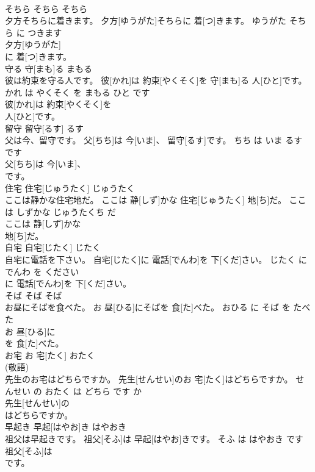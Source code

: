 \documentclass[8pt]{extreport}
\begin{document}
\begin{CJK}{UTF8}{min}
\\	そちら	そちら	そちら	
\\	夕方そちらに着きます。	夕方[ゆうがた]そちらに 着[つ]きます。	ゆうがた そちら に つきます	
\\	夕方[ゆうがた]
\\	に 着[つ]きます。		
\\	守る	守[まも]る	まもる	
\\	彼は約束を守る人です。	彼[かれ]は 約束[やくそく]を 守[まも]る 人[ひと]です。	かれ は やくそく を まもる ひと です	
\\	彼[かれ]は 約束[やくそく]を
\\	人[ひと]です。		
\\	留守	留守[るす]	るす	
\\	父は今、留守です。	父[ちち]は 今[いま]、 留守[るす]です。	ちち は いま るす です	
\\	父[ちち]は 今[いま]、
\\	です。		
\\	住宅	住宅[じゅうたく]	じゅうたく	
\\	ここは静かな住宅地だ。	ここは 静[しず]かな 住宅[じゅうたく] 地[ち]だ。	ここ は しずかな じゅうたくち だ	
\\	ここは 静[しず]かな
\\	地[ち]だ。		
\\	自宅	自宅[じたく]	じたく	
\\	自宅に電話を下さい。	自宅[じたく]に 電話[でんわ]を 下[くだ]さい。	じたく に でんわ を ください	
\\	に 電話[でんわ]を 下[くだ]さい。		
\\	そば	そば	そば	
\\	お昼にそばを食べた。	お 昼[ひる]にそばを 食[た]べた。	おひる に そば を たべた	
\\	お 昼[ひる]に
\\	を 食[た]べた。		
\\	お宅	お 宅[たく]	おたく	
\\	(敬語)		
\\	先生のお宅はどちらですか。	先生[せんせい]のお 宅[たく]はどちらですか。	せんせい の おたく は どちら です か	
\\	先生[せんせい]の
\\	はどちらですか。		
\\	早起き	早起[はやお]き	はやおき	
\\	祖父は早起きです。	祖父[そふ]は 早起[はやお]きです。	そふ は はやおき です	
\\	祖父[そふ]は
\\	です。		

\end{CJK}
\end{document}
